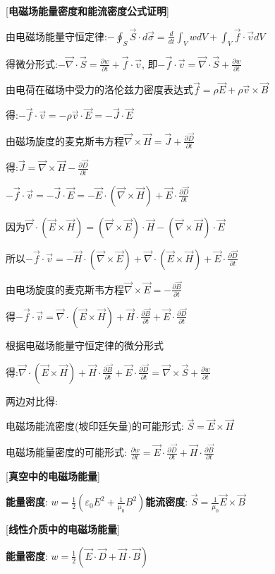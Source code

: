 [\textbf{电磁场能量密度和能流密度公式证明}] \par
\qquad 由电磁场能量守恒定律:$-\oint_S\vec S\cdot d\vec\sigma=\frac{d}{dt}\int_V w dV+\int_V\vec f\cdot\vec vdV$\par
\qquad \quad 得微分形式:$-\vec\nabla\cdot\vec S=\frac{\partial w}{\partial t}+\vec f\cdot\vec v$, 即$-\vec f\cdot\vec v=\vec\nabla\cdot\vec S+\frac{\partial w}{\partial t}$\par
\qquad 由电荷在磁场中受力的洛伦兹力密度表达式$\vec f=\rho\vec E+\rho\vec v\times\vec B$\par
\qquad \quad 得:$-\vec f\cdot\vec v=-\rho\vec v\cdot\vec E=-\vec J\cdot\vec E$\par
\qquad 由磁场旋度的麦克斯韦方程$\vec\nabla\times\vec H=\vec J+\frac{\partial \vec D}{\partial t}$\par
\qquad \quad 得:$\vec J=\vec\nabla\times\vec H-\frac{\partial\vec D}{\partial t}$\par
\qquad $-\vec f\cdot\vec v=-\vec J\cdot\vec E=-\vec E\cdot(\vec\nabla\times\vec H)+\vec E\cdot\frac{\partial \vec D}{\partial t}$\par
\qquad 因为$\vec\nabla\cdot(\vec E\times\vec H)=(\vec\nabla\times\vec E)\cdot\vec H-(\vec\nabla\times\vec H)\cdot\vec E$\par
\qquad \quad 所以$-\vec f\cdot\vec v=-\vec H\cdot(\vec\nabla\times\vec E)+\vec\nabla\cdot(\vec E\times\vec H)+\vec E\cdot\frac{\partial\vec D}{\partial t}$\par
\qquad 由电场旋度的麦克斯韦方程$\vec\nabla\times\vec E=-\frac{\partial\vec B}{\partial t}$\par
\qquad \quad 得$-\vec f\cdot\vec v=\vec\nabla\cdot(\vec E\times\vec H)+\vec H\cdot\frac{\partial\vec B}{\partial t}+\vec E\cdot\frac{\partial\vec D}{\partial t}$\par
\qquad 根据电磁场能量守恒定律的微分形式\par
\qquad \quad 得:$\vec\nabla\cdot(\vec E\times\vec H)+\vec H\cdot\frac{\partial\vec B}{\partial t}+\vec E\cdot\frac{\partial \vec D}{\partial t}=\vec\nabla\times\vec S+\frac{\partial w}{\partial t}$\par
\qquad 两边对比得:\par
\qquad \quad 电磁场能流密度(坡印廷矢量)的可能形式: $\vec S=\vec E\times\vec H$\par
\qquad \quad 电磁场能量密度的可能形式: $\frac{\partial w}{\partial t}=\vec E\cdot\frac{\partial\vec D}{\partial t}+\vec H\cdot\frac{\partial\vec B}{\partial t}$

[\textbf{真空中的电磁场能量}]\par
\qquad \textbf{能量密度}: $w=\frac{1}{2}(\varepsilon_0E^2+\frac{1}{\mu_0}B^2)$\qquad \textbf{能流密度}: $\vec S=\frac{1}{\mu_0}\vec E\times\vec B$\par

[\textbf{线性介质中的电磁场能量}]\par
\qquad \textbf{能量密度}: $w=\frac{1}{2}(\vec E\cdot\vec D+\vec H\cdot\vec B)$


